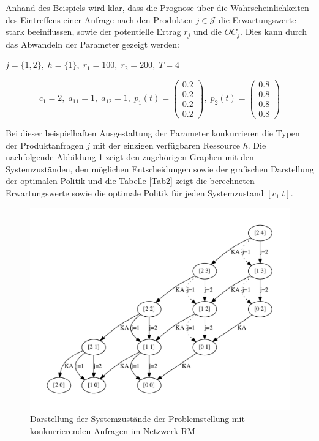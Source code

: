 Anhand des Beispiels wird klar, dass die Prognose über die Wahrscheinlichkeiten des Eintreffens einer Anfrage nach den Produkten $j\in\mathcal{J}$ die Erwartungswerte stark beeinflussen, sowie der potentielle Ertrag $r_{j}$ und die $OC_{j}$. Dies kann durch das Abwandeln der Parameter gezeigt werden:
\begin{center}
$j = \{1, 2\}, \; h = \{1\}, \; r_{1} = 100, \; r_{2} = 200, \; T=4$
\end{center}
\[
    c_{1}= 2, \;
    a_{11}=1, \;
     a_{12}=1, \;
     p_{1}(t)=\begin{pmatrix} 0.2\\ 0.2\\ 0.2\\ 0.2  \end{pmatrix}, \;
     p_{2}(t)=\begin{pmatrix} 0.8\\ 0.8\\ 0.8\\ 0.8  \end{pmatrix}
  \]
  
Bei dieser beispielhaften Ausgestaltung der Parameter konkurrieren die Typen der Produktanfragen $j$ mit der einzigen verfügbaren Ressource $h$. Die nachfolgende Abbildung \ref{B2} zeigt den zugehörigen Graphen mit den Systemzuständen, den möglichen Entscheidungen sowie der grafischen Darstellung der optimalen Politik und die Tabelle \ref{Tab2} zeigt die berechneten Erwartungswerte sowie die optimale Politik für jeden Systemzustand $[c_1\;t]$.
\begin{figure}[h!]
  \begin{center}
    \includegraphics[width=120mm]{Bilder/Beispiel2.pdf}
    \caption{Darstellung der Systemzustände der Problemstellung mit konkurrierenden Anfragen im Netzwerk RM}  \label{B2}
  \end{center}
\end{figure}

